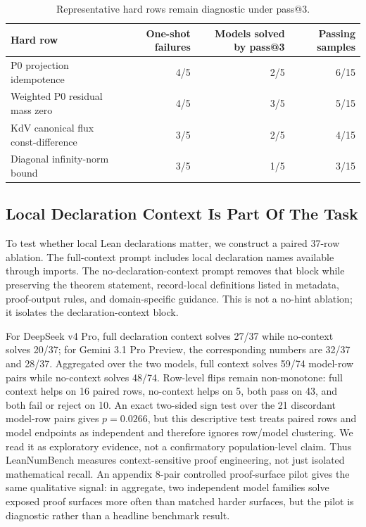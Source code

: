\documentclass{article}
\begin{document}
\begin{table}[H]
\centering
\caption{Representative hard rows remain diagnostic under pass@3.}
\label{tab:hard-subset-mini}
\scriptsize
\begin{tabularx}{\linewidth}{Xrrr}
\toprule
Hard row & One-shot failures & Models solved by pass@3 & Passing samples\\
\midrule
P0 projection idempotence & 4/5 & 2/5 & 6/15\\
Weighted P0 residual mass zero & 4/5 & 3/5 & 5/15\\
KdV canonical flux const-difference & 3/5 & 2/5 & 4/15\\
Diagonal infinity-norm bound & 3/5 & 1/5 & 3/15\\
\bottomrule
\end{tabularx}
\end{table}

\subsection{Local Declaration Context Is Part Of The Task}

To test whether local Lean declarations matter, we construct a paired 37-row
ablation. The full-context prompt includes local declaration names available
through imports. The no-declaration-context prompt removes that block while
preserving the theorem statement, record-local definitions listed in metadata,
proof-output rules, and domain-specific guidance. This is not a no-hint
ablation; it isolates the declaration-context block.

For DeepSeek v4 Pro, full declaration context solves 27/37 while no-context
solves 20/37; for Gemini 3.1 Pro Preview, the corresponding numbers are 32/37
and 28/37. Aggregated over the two models, full context solves 59/74
model-row pairs while no-context solves 48/74. Row-level flips remain
non-monotone: full context helps on 16 paired rows, no-context helps on 5,
both pass on 43, and both fail or reject on 10. An exact two-sided sign test
over the 21 discordant model-row pairs gives \(p=0.0266\), but this
descriptive test treats paired rows and model endpoints as independent and
therefore ignores row/model clustering. We read it as exploratory evidence,
not a confirmatory population-level claim. Thus LeanNumBench measures
context-sensitive proof engineering, not just isolated mathematical recall. An
appendix 8-pair controlled proof-surface pilot gives the same qualitative
signal: in aggregate, two independent model families solve exposed proof
surfaces more often than matched harder surfaces, but the pilot is diagnostic
rather than a headline benchmark result.
\end{document}
